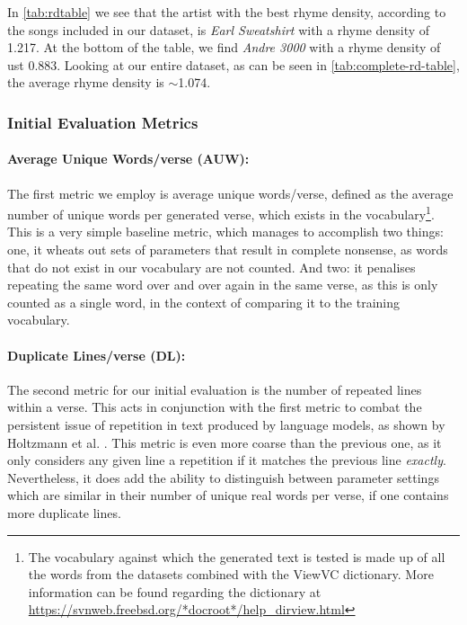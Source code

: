 In \cref{tab:rdtable} we see that the artist with the best rhyme density, according to the songs included in our dataset, is \textit{Earl Sweatshirt} with a rhyme density of 1.217. At the bottom of the table, we find \textit{Andre 3000} with a rhyme density of ust 0.883. Looking at our entire dataset, as can be seen in \cref{tab:complete-rd-table}, the average rhyme density is $\sim$1.074.

\subsubsection{Initial Evaluation Metrics}
\label{sec:initial-eval-metrics}

\paragraph{Average Unique Words/verse (AUW):\\[6pt]}
\label{para:avg-unique-words/v}

The first metric we employ is average unique words/verse, defined as the average number of unique words per generated verse, which exists in the vocabulary\footnote{The vocabulary against which the generated text is tested is made up of all the words from the datasets combined with the ViewVC dictionary. More information can be found regarding the dictionary at \url{https://svnweb.freebsd.org/*docroot*/help_dirview.html}}. This is a very simple baseline metric, which manages to accomplish two things: one, it wheats out sets of parameters that result in complete nonsense, as words that do not exist in our vocabulary are not counted. And two: it penalises repeating the same word over and over again in the same verse, as this is only counted as a single word, in the context of comparing it to the training vocabulary.

\paragraph{Duplicate Lines/verse (DL):\\[6pt]}
\label{para:dupes/v}

The second metric for our initial evaluation is the number of repeated lines within a verse. This acts in conjunction with the first metric to combat the persistent issue of repetition in text produced by language models, as shown by Holtzmann et al. \cite{HoltzmanAri2019TCCo}. This metric is even more coarse than the previous one, as it only considers any given line a repetition if it matches the previous line \textit{exactly}. Nevertheless, it does add the ability to distinguish between parameter settings which are similar in their number of unique real words per verse, if one contains more duplicate lines.

